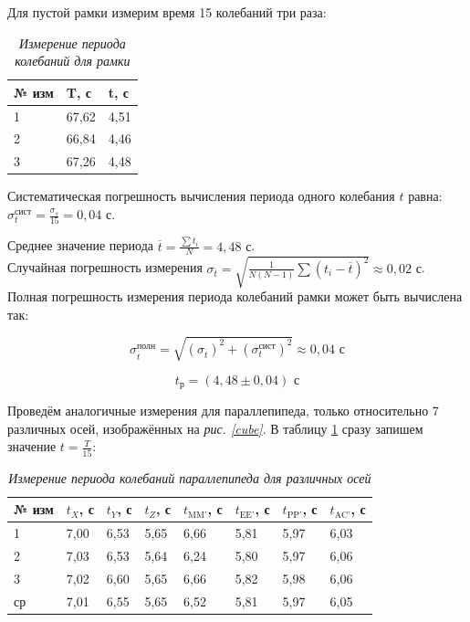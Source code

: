 \documentclass[a4paper,12pt]{article}
\begin{document}
Для пустой рамки измерим время 15 колебаний три раза:

\begin{table}[!ht]
    \centering
    \begin{tabular}{|l|l|l|}
    \hline
        № изм & T, с & t, с \\ \hline
        1 & 67,62  & 4,51 \\ \hline
        2 & 66,84  & 4,46 \\ \hline
        3 & 67,26  & 4,48 \\ \hline
    \end{tabular}\caption{\textit{Измерение периода колебаний для рамки}}
\end{table}

Систематическая погрешность вычисления периода одного колебания $t$ равна: $\sigma_t^\text{сист} = \frac{\sigma_s}{15} = 0,04 \text{ с}$.

Среднее значение периода $ \overline{t} = \frac{\sum t_i}{N} = 4,48 \text{ с}$.\\

Случайная погрешность измерения $ \sigma_{\overline{t}} = \sqrt{\frac{1}{N  (N-1)}\sum(t_i-\overline{t})^2} \approx 0,02 \text{ с}$. \\

Полная погрешность измерения периода колебаний рамки может быть вычислена так:

\begin{equation}
    \sigma^{\text{полн}}_{\overline{t}} = \sqrt{\left( \sigma_{\overline{t}} \right)^2 + \left( \sigma_t^\text{сист} \right) ^ 2} \approx 0,04 \text{ с}
\end{equation}

\begin{equation}
    t_{\text{р}} = ( 4,48 \pm 0,04 ) \text{ с}
\end{equation}

Проведём аналогичные измерения для параллепипеда, только относительно 7 различных осей, изображённых на \textit{рис. \ref{cube}}. В таблицу \ref{almost_cube} сразу запишем значение $t = \frac{T}{15}$:

\begin{table}[!ht]
    \centering
    \begin{tabular}{|l|l|l|l|l|l|l|l|}
    \hline
        № изм & $t_X$, с & $t_Y$, с & $t_Z$, с & $t_\text{MM'}$, с & $t_\text{EE'}$, с & $t_\text{PP'}$, с & $t_\text{AC'}$, с \\ \hline
        1 & 7,00 & 6,53 & 5,65 & 6,66 & 5,81 & 5,97 & 6,03  \\ \hline
        2 & 7,03 & 6,53 & 5,64 & 6,24 & 5,80 & 5,97 & 6,06  \\ \hline
        3 & 7,02 & 6,60 & 5,65 & 6,66 & 5,82 & 5,98 & 6,06  \\ \hline
        ср & 7,01 & 6,55 & 5,65 & 6,52 & 5,81 & 5,97 & 6,05  \\ \hline
    \end{tabular}\caption{\textit{Измерение периода колебаний параллепипеда для различных осей}}\label{almost_cube}
\end{table}
\end{document}
